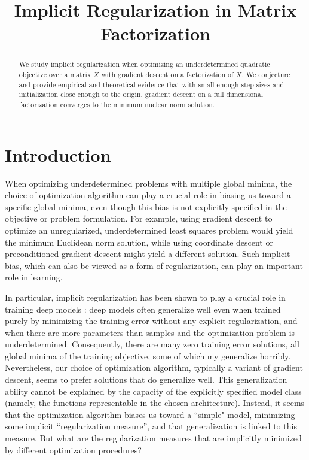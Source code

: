 \title{Implicit Regularization in Matrix Factorization}

\begin{abstract}
We study implicit regularization when optimizing an underdetermined quadratic objective over a matrix $X$ with gradient descent on a factorization of $X$.  We conjecture and provide empirical and theoretical evidence that with small enough step sizes and initialization close enough to the origin, gradient descent on a full dimensional factorization converges to the minimum nuclear norm solution.
\end{abstract}

\section{Introduction}
When optimizing underdetermined problems with multiple global minima, the choice of optimization algorithm can play a crucial role in biasing us toward a specific global minima, even though this bias is not explicitly specified in the objective or problem formulation.  For example, using gradient descent to optimize an unregularized, underdetermined least squares problem would yield the minimum Euclidean norm solution, while using coordinate descent or preconditioned gradient descent might yield a different solution. Such implicit bias, which can also be viewed as a form of regularization, can play an important role in learning.  

In particular, implicit regularization has been shown to play a crucial role in training deep models \citep{neyshabur2015search,neyshabur2017geometry,zhang2017understanding,keskar2017large}: deep models often generalize well even when trained purely by minimizing the training error without any explicit regularization, and when there are more parameters than samples and the optimization problem is underdetermined.  Consequently, there are many zero training error solutions, all global minima of the training objective, some of which my generalize horribly. Nevertheless, our choice of optimization algorithm, typically a variant of gradient descent, seems to prefer solutions that do generalize well.  This generalization ability cannot be explained by the capacity of the explicitly specified model class (namely, the functions representable in the chosen architecture).  Instead, it seems that the optimization algorithm biases us toward a ``simple" model, minimizing some implicit “regularization measure”, and that generalization is linked to this measure.  But what are the regularization measures that are implicitly minimized by different optimization procedures?

